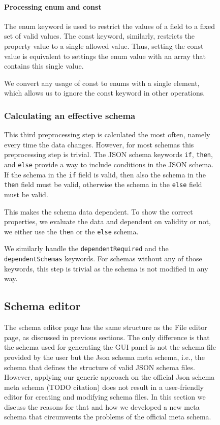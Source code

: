 \begin{figure}[h]
\paragraph{Processing enum and const}
The enum keyword is used to restrict the values of a field to a fixed set of valid values.
The const keyword, similarly, restricts the property value to a single allowed value.
Thus, setting the const value is equivalent to settings the enum value with an array that contains this single value.

We convert any usage of const to enums with a single element, which allows us to ignore the const keyword in other operations.

\subsubsection{Calculating an effective schema}

This third preprocessing step is calculated the most often, namely every time the data changes.
However, for most schemas this preprocessing step is trivial.
The JSON schema keywords \texttt{if}, \texttt{then}, and \texttt{else} provide a way to include conditions in the JSON schema.
If the schema in the \texttt{if} field is valid, then also the schema in the \texttt{then} field must be valid, otherwise the
schema in the \texttt{else} field must be valid.

This makes the schema data dependent.
To show the correct properties, we evaluate the data and dependent on validity or not, we either use the \texttt{then} or the \texttt{else} schema.

We similarly handle the \texttt{dependentRequired} and the \texttt{dependentSchemas} keywords.
For schemas without any of those keywords, this step is trivial as the schema is not modified in any way.


\subsection{Schema editor}\label{subsec:schema-editor}

The schema editor page has the same structure as the File editor page, as discussed in previous sections.
The only difference is that the schema used for generating the GUI panel is not the schema file provided by the user but the Json schema meta schema,
i.e., the schema that defines the structure of valid JSON schema files.
However, applying our generic approach on the official Json schema meta schema (TODO citation) does not result in a user-friendly editor for
creating and modifying schema files.
In this section we discuss the reasons for that and how we developed a new meta schema that circumvents the problems of the official meta schema.


\end{figure}
